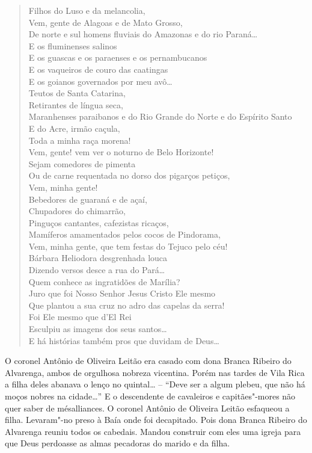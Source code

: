 \begin{verse}
Filhos do Luso e da melancolia,\\
Vem, gente de Alagoas e de Mato Grosso,\\
De norte e sul homens fluviais do Amazonas e do rio Paraná\ldots{}\\
E os fluminenses salinos\\
E os guascas e os paraenses e os pernambucanos\\
E os vaqueiros de couro das caatingas\\
E os goianos governados por meu avô\ldots{}\\
Teutos de Santa Catarina,\\
Retirantes de língua seca,\\
Maranhenses paraibanos e do Rio Grande do Norte e do Espírito Santo\\
E do Acre, irmão caçula,\\
Toda a minha raça morena!\\
Vem, gente! vem ver o noturno de Belo Horizonte!\\
Sejam comedores de pimenta\\
Ou de carne requentada no dorso dos pigarços petiços,\\
Vem, minha gente!\\
Bebedores de guaraná e de açaí,\\
Chupadores do chimarrão,\\
Pinguços cantantes, cafezistas ricaços,\\
Mamíferos amamentados pelos cocos de Pindorama,\\
Vem, minha gente, que tem festas do Tejuco pelo céu!\\
Bárbara Heliodora desgrenhada louca\\
Dizendo versos desce a rua do Pará\ldots{}\\
Quem conhece as ingratidões de Marília?\\
Juro que foi Nosso Senhor Jesus Cristo Ele mesmo\\
Que plantou a sua cruz no adro das capelas da serra!\\
Foi Ele mesmo que d'El Rei\\
Esculpiu as imagens dos seus santos\ldots{}\\
E há histórias também pros que duvidam de Deus\ldots{}\\
\end{verse}

\parbox{\textwidth}{
O coronel Antônio de Oliveira Leitão era casado com dona Branca Ribeiro
do Alvarenga, ambos de orgulhosa nobreza vicentina. Porém nas tardes de
Vila Rica a filha deles abanava o lenço no quintal\ldots{} -- ``Deve ser a
algum plebeu, que não há moços nobres na cidade\ldots{}'' E o descendente de
cavaleiros e capitães"-mores não quer saber de mésalliances. O coronel
Antônio de Oliveira Leitão esfaqueou a filha. Levaram"-no preso à Baía
onde foi decapitado. Pois dona Branca Ribeiro do Alvarenga reuniu todos
os cabedais. Mandou construir com eles uma igreja para que Deus
perdoasse as almas pecadoras do marido e da filha.}

